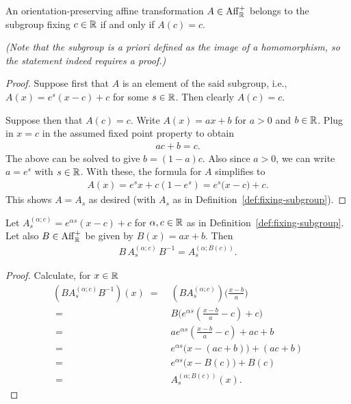 \begin{lemma}
  \label{lem:fixing-subgroup-characterization}
  \leanok
  An orientation-preserving affine transformation $A \in \mathrm{Aff}^+_{\mathbb{R}}$
  belongs to the subgroup fixing $c \in \mathbb{R}$ if and only if $A(c) = c$.

  \emph{(Note that the subgroup is a priori defined as the image of a homomorphism,
  so the statement indeed requires a proof.)}
\end{lemma}
\begin{proof}
  Suppose first that $A$ is an element of the said subgroup, i.e.,
  $A(x) = e^{s} (x - c) + c$ for some $s \in \mathbb{R}$. Then clearly $A(c) = c$.

  Suppose then that $A(c) = c$. Write $A(x) = a x + b$ for $a>0$ and $b \in \mathbb{R}$.
  Plug in $x=c$ in the assumed fixed point property to obtain
  \begin{align*}
    a c + b = c .
  \end{align*}
  The above can be solved to give $b = (1-a)c$.
  Also since $a>0$, we can write $a = e^s$ with $s \in \mathbb{R}$.
  With these, the formula for $A$ simplifies to
  \begin{align*}
    A(x) = e^s x + c (1 - e^s) = e^s \big( x - c \big) + c .
  \end{align*}
  This shows $A = A_s$ as desired (with $A_s$ as in Definition~\ref{def:fixing-subgroup}).
\end{proof}

\begin{lemma}
  \label{lem:conjugate-fixing}
  Let $A^{(\alpha;c)}_s = e^{\alpha s} (x - c) + c$ for $\alpha, c \in \mathbb{R}$ as in
  Definition~\ref{def:fixing-subgroup}. Let
  also $B \in \mathrm{Aff}^+_{\mathbb{R}}$ be given by $B(x) = a x + b$. Then
  \begin{align*}
    B \, A^{(\alpha;c)}_s \, B^{-1} = A^{(\alpha;B(c))}_{s} .
  \end{align*}
\end{lemma}
\begin{proof}
  Calculate, for $x \in \mathbb{R}$
  \begin{align*}
    (B A^{(\alpha;c)}_s B^{-1})(x) \; = \; & (B A^{(\alpha;c)}_s)\big( \frac{x-b}{a} \big) \\
    \; = \; & B\big( e^{\alpha s} (\frac{x-b}{a} - c) + c \big) \\
    \; = \; & a e^{\alpha s} (\frac{x-b}{a} - c) + a c + b \\
    \; = \; & e^{\alpha s} \big( x - (a c + b) \big) + (a c + b) \\
    \; = \; & e^{\alpha s} \big( x - B(c) \big) + B(c) \\
    \; = \; & A^{(\alpha;B(c))}_s (x) .
  \end{align*}
\end{proof}


